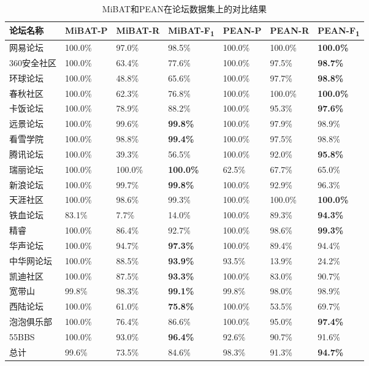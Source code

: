 \begin{table}[htbp]
\caption{MiBAT和PEAN在论坛数据集上的对比结果}
\label{tbl:pean-all}
\vspace{0.5em}\centering\wuhao
\begin{tabular}{lllllll}
\toprule[1.5pt]
论坛名称 & MiBAT-P & MiBAT-R & MiBAT-F\textsubscript{1} &
PEAN-P & PEAN-R & PEAN-F\textsubscript{1} \\
\midrule[1pt]
网易论坛 & 100.0\% & 97.0\% & 98.5\% & 100.0\% & 100.0\% & \textbf{100.0\%} \\
360安全社区 & 100.0\% & 63.4\% & 77.6\% & 100.0\% & 97.5\% & \textbf{98.7\%} \\ 
环球论坛 & 100.0\% & 48.8\% & 65.6\% & 100.0\% & 97.7\% & \textbf{98.8\%} \\
春秋社区 & 100.0\% & 62.3\% & 76.8\% & 100.0\% & 100.0\% & \textbf{100.0\%} \\
卡饭论坛 & 100.0\% & 78.9\% & 88.2\% & 100.0\% & 95.3\% & \textbf{97.6\%} \\
远景论坛 & 100.0\% & 99.6\% & \textbf{99.8\%} & 100.0\% & 97.9\% & 98.9\% \\
看雪学院 & 100.0\% & 98.8\% & \textbf{99.4\%} & 100.0\% & 97.5\% & 98.8\% \\
腾讯论坛 & 100.0\% & 39.3\% & 56.5\% & 100.0\% & 92.0\% & \textbf{95.8\%} \\
瑞丽论坛 & 100.0\% & 100.0\% & \textbf{100.0\%} & 62.5\% & 67.7\% & 65.0\% \\
新浪论坛 & 100.0\% & 99.7\% & \textbf{99.8\%} & 100.0\% & 92.9\% & 96.3\% \\
天涯社区 & 100.0\% & 98.6\% & 99.3\% & 100.0\% & 100.0\% & \textbf{100.0\%} \\
铁血论坛 & 83.1\% & 7.7\% & 14.0\% & 100.0\% & 89.3\% & \textbf{94.3\%} \\
精睿 & 100.0\% & 86.4\% & 92.7\% & 100.0\% & 98.6\% & \textbf{99.3\%} \\
华声论坛 & 100.0\% & 94.7\% & \textbf{97.3\%} & 100.0\% & 89.4\% & 94.4\% \\
中华网论坛 & 100.0\% & 88.5\% & \textbf{93.9\%} & 93.5\% & 13.9\% & 24.2\% \\
凯迪社区 & 100.0\% & 87.5\% & \textbf{93.3\%} & 100.0\% & 83.0\% & 90.7\% \\
宽带山 & 99.8\% & 98.3\% & \textbf{99.1\%} & 99.8\% & 98.0\% & 98.9\% \\
西陆论坛 & 100.0\% & 61.0\% & \textbf{75.8\%} & 100.0\% & 53.5\% & 69.7\% \\
泡泡俱乐部 & 100.0\% & 76.4\% & 86.6\% & 100.0\% & 95.0\% & \textbf{97.4\%} \\ 
55BBS & 100.0\% & 93.0\% & \textbf{96.4\%} & 92.6\% & 90.7\% & 91.6\% \\
总计 & 99.6\% & 73.5\% & 84.6\% & 98.3\% & 91.3\% & \textbf{94.7\%} \\
\bottomrule[1.5pt]
\end{tabular}
\end{table}

